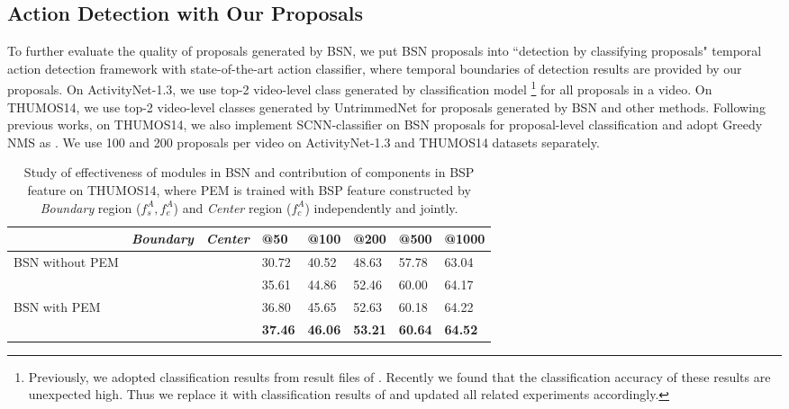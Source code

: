 \documentclass[runningheads]{llncs}
\begin{document}
\subsection{Action Detection with  Our Proposals}

To further evaluate the quality of proposals generated by BSN, we put BSN proposals into ``detection by classifying proposals" temporal action detection framework with state-of-the-art action classifier, where  temporal boundaries of detection results are provided by our proposals.
%
On ActivityNet-1.3, we use top-2 video-level class generated by classification model \cite{zhao2017cuhk}\footnote{Previously, we adopted classification results from result files of \cite{wang2016uts}. Recently we found that the classification accuracy of these results are unexpected high. Thus we replace it with classification results of \cite{zhao2017cuhk} and updated all related experiments accordingly.}  for all proposals in a video. %
On THUMOS14, we use top-2 video-level classes generated by UntrimmedNet \cite{wang2017untrimmednets} for proposals generated by BSN and other methods.%
Following  previous works,  on THUMOS14, we also implement SCNN-classifier on BSN proposals for proposal-level classification and  adopt Greedy NMS  as \cite{shou2016action}.
We use 100 and 200 proposals per video on ActivityNet-1.3  and THUMOS14 datasets separately.

\begin{table}[tbp]
\setlength{\abovecaptionskip}{0.1cm} %
\small
\centering
\caption{ Study of effectiveness of modules in BSN and  contribution of components in BSP feature on THUMOS14, where PEM is trained with BSP feature constructed by   \emph{Boundary} region ($f_s^A,f_e^A$) and   \emph{Center} region ($f_c^A$) independently and jointly.}
\begin{tabular}{p{2.7cm}p{1.3cm}<{\centering}p{1.3cm}<{\centering}p{1.2cm}<{\centering}p{1.2cm}<{\centering} p{1.2cm}<{\centering}p{1.2cm}<{\centering}p{1.2cm}<{\centering}}
\toprule
					& \emph{Boundary} 	& \emph{Center} 	& @50	& @100 	& @200	& @500	& @1000 \\
 \hline
 BSN without PEM 	&			&			& 30.72	& 40.52 	& 48.63	& 57.78	& 63.04\\
 \hline
 					&\Checkmark 	& 			& 35.61	& 44.86	& 52.46	& 60.00	& 64.17\\
 BSN with PEM 		&  			&\Checkmark	& 36.80	& 45.65	& 52.63	& 60.18	& 64.22\\
 					&\Checkmark	&\Checkmark	& {\bf 37.46}	& {\bf 46.06	}& {\bf 53.21}	& {\bf 60.64}	& {\bf 64.52}\\
\bottomrule
\end{tabular}
\label{table_post}
\vspace{-0.6cm}
\end{table}
\end{document}
